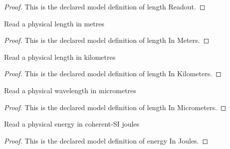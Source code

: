 \begin{proof}
  This is the declared model definition of length Readout.
\end{proof}
\begin{definition}
  \label{def:physics:phyx-mini-0579:phyxminiproblems-problemphyxmini0579-lengthinmeters}
  Read a physical length in metres
\end{definition}
\begin{proof}
  This is the declared model definition of length In Meters.
\end{proof}
\begin{definition}
  \label{def:physics:phyx-mini-0579:phyxminiproblems-problemphyxmini0579-lengthinkilometers}
  Read a physical length in kilometres
\end{definition}
\begin{proof}
  This is the declared model definition of length In Kilometers.
\end{proof}
\begin{definition}
  \label{def:physics:phyx-mini-0579:phyxminiproblems-problemphyxmini0579-lengthinmicrometers}
  Read a physical wavelength in micrometres
\end{definition}
\begin{proof}
  This is the declared model definition of length In Micrometers.
\end{proof}
\begin{definition}
  \label{def:physics:phyx-mini-0579:phyxminiproblems-problemphyxmini0579-energyinjoules}
  Read a physical energy in coherent-SI joules
\end{definition}
\begin{proof}
  This is the declared model definition of energy In Joules.
\end{proof}
